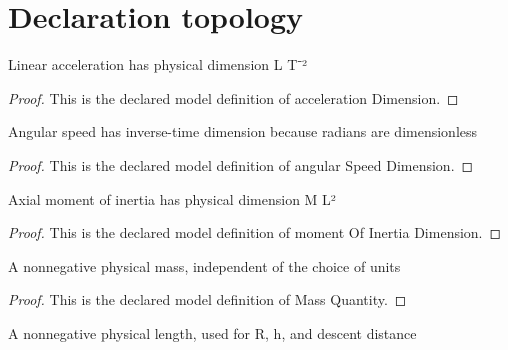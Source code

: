\section{Declaration topology}
\begin{definition}
  \label{def:physics:phyx-mini-0824:phyxminiproblems-problemphyxmini0824-accelerationdimension}
  Linear acceleration has physical dimension L T⁻²
\end{definition}
\begin{proof}
  This is the declared model definition of acceleration Dimension.
\end{proof}
\begin{definition}
  \label{def:physics:phyx-mini-0824:phyxminiproblems-problemphyxmini0824-angularspeeddimension}
  Angular speed has inverse-time dimension because radians are dimensionless
\end{definition}
\begin{proof}
  This is the declared model definition of angular Speed Dimension.
\end{proof}
\begin{definition}
  \label{def:physics:phyx-mini-0824:phyxminiproblems-problemphyxmini0824-momentofinertiadimension}
  Axial moment of inertia has physical dimension M L²
\end{definition}
\begin{proof}
  This is the declared model definition of moment Of Inertia Dimension.
\end{proof}
\begin{definition}
  \label{def:physics:phyx-mini-0824:phyxminiproblems-problemphyxmini0824-massquantity}
  A nonnegative physical mass, independent of the choice of units
\end{definition}
\begin{proof}
  This is the declared model definition of Mass Quantity.
\end{proof}
\begin{definition}
  \label{def:physics:phyx-mini-0824:phyxminiproblems-problemphyxmini0824-lengthquantity}
  A nonnegative physical length, used for R, h, and descent distance
\end{definition}
